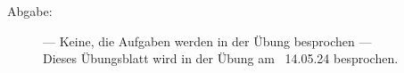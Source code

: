 \documentclass[a4paper,11pt]{scrartcl}
\begin{document}

\begin{description}
\item[Abgabe:] --- Keine, die Aufgaben werden in der Übung besprochen ---\\
Dieses Übungsblatt wird in der Übung am ~14.05.24 besprochen.



\end{description}
\end{document}
